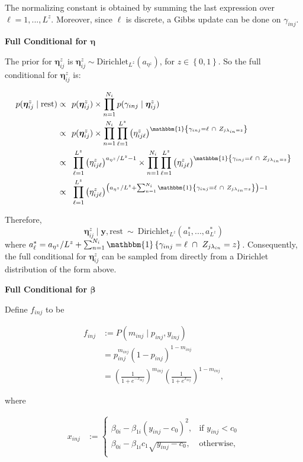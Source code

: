 \documentclass[12pt,]{article}
\newcommand{\p}[1]{\left(#1\right)}
\newcommand{\bc}[1]{ \left\{#1\right\} }
\def\Dir{\text{Dirichlet}}
\def\lin{\lambda_{in}}
\def\y{\bm{y}}
\newcommand{\Ind}[1]{\mathbbm{1}\bc{#1}}
\def\rest{\text{rest}}
\begin{document}
The normalizing constant is obtained by summing the last expression over
\(\ell = 1,...,L^z\). Moreover, since \(\ell\) is discrete, a Gibbs
update can be done on \(\gamma_{inj}\).
\vspace{2em}


\textbf{Full Conditional for $\bm\eta$}

The prior for \(\bm\eta^z_{ij}\) is
\(\bm \eta^z_{ij} \sim \Dir_{L^z}(a_{\eta^z})\), for \(z\in\bc{0,1}\).
So the full conditional for \(\bm\eta^z_{ij}\) is:

\begin{align*}
p(\bm \eta^z_{ij} \mid \rest) \propto&~~ p(\bm{\eta}^z_{ij}) \times \prod_{n=1}^{N_i} p(\gamma_{inj} \mid \bm \eta^z_{ij})\\
\propto&~~ p(\bm \eta^z_{ij}) \times \prod_{n=1}^{N_i}\prod_{\ell=1}^{L^z} \p{\eta^z_{ij\ell}}^{\Ind{ \gamma_{inj}=\ell ~\cap~ Z_{j\lin=z}}}\\
%
\propto&~~ \prod_{\ell=1}^{L^z} \p{\eta^z_{ij\ell}}^{a_{\eta^z}/L^z-1} \times 
\prod_{n=1}^{N_i}\prod_{\ell=1}^{L^z} \p{\eta^z_{ij\ell}}^{\Ind{ \gamma_{inj}=\ell ~\cap~ Z_{j\lin=z}}}\\
\propto&~~ \prod_{\ell=1}^{L^z} \p{\eta^z_{ij\ell}}^{\p{a_{\eta^z} / L^z + \sum_{n=1}^{N_i} \Ind{ \gamma_{inj}=\ell ~\cap~ Z_{j\lin=z}}} - 1}\\
%
\end{align*}

Therefore, \[
\bm{\eta}^z_{ij} \mid \y,\rest ~\sim~ \Dir_{L^z}\p{a^*_1,...,a^*_{L^z}}
\] where
\(a^*_\ell = a_{\eta^z}/L^z+\sum_{n=1}^{N_i}\Ind{\gamma_{inj}=\ell ~\cap~ Z_{j\lin}=z}\).
Consequently, the full conditional for \(\bm{\eta}^z_{ij}\) can be
sampled from directly from a Dirichlet distribution of the form above.
\vspace{2em}


\textbf{Full Conditional for $\bm\beta$}

Define \(f_{inj}\) to be

\begin{align*}
f_{inj} &:= P(m_{inj} \mid p_{inj}, y_{inj}) \\
&= p_{inj}^{m_{inj}} (1-p_{inj})^{1 - m_{inj}} \\
&= \left(\frac{1}{1+e^{-x_{inj}}} \right)^{m_{inj}}\left(\frac{1}{1+e^{x_{inj}}} \right)^{1-m_{inj}},
\end{align*}

where

\begin{align*}
  x_{inj} &:= \begin{cases}
  \beta_{0i} - \beta_{1i}(y_{inj}-c_0)^2, & \text{if } y_{inj} < c_0\nonumber \\
  \beta_{0i} - \beta_{1i}c_1\sqrt{y_{inj}-c_0}, & \text{otherwise}, \nonumber \\
  \end{cases}\\
\end{align*}
\end{document}
